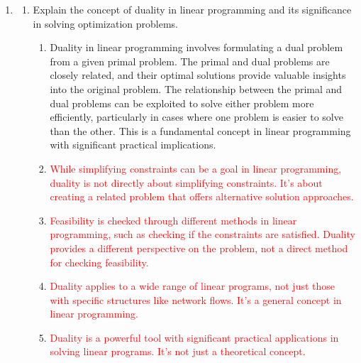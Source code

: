\documentclass{article}%
\newcommand{\incorrect}[1]{\textcolor{red}{#1}}
\begin{document}
\begin{enumerate}
\begin{enumerate}
\item The Complementary Slackness Theorem states that if $x$ and $y$ are optimal solutions to the primal and dual problems respectively, then for each pair of primal and dual variables, at least one must be zero. This provides a necessary and sufficient condition for optimality.%
\item \incorrect{Complementary slackness doesn't guarantee the existence of a finite optimal solution; it only describes a condition that must hold if optimal solutions exist.}%
\item \incorrect{Complementary slackness relates both the objective function values and the variables at optimality.}%
\end{enumerate}%
\vspace{1em}%
\item%
\begin{enumerate}%
\item Explain the concept of duality in linear programming and its significance in solving optimization problems.%
\begin{enumerate}%
\item Duality in linear programming involves formulating a dual problem from a given primal problem.  The primal and dual problems are closely related, and their optimal solutions provide valuable insights into the original problem.  The relationship between the primal and dual problems can be exploited to solve either problem more efficiently, particularly in cases where one problem is easier to solve than the other.  This is a fundamental concept in linear programming with significant practical implications.%
\item \incorrect{While simplifying constraints can be a goal in linear programming, duality is not directly about simplifying constraints.  It's about creating a related problem that offers alternative solution approaches.}%
\item \incorrect{Feasibility is checked through different methods in linear programming, such as checking if the constraints are satisfied. Duality provides a different perspective on the problem, not a direct method for checking feasibility.}%
\item \incorrect{Duality applies to a wide range of linear programs, not just those with specific structures like network flows.  It's a general concept in linear programming.}%
\item \incorrect{Duality is a powerful tool with significant practical applications in solving linear programs.  It's not just a theoretical concept.}%

\end{enumerate}
\end{enumerate}
\end{enumerate}
\end{document}
